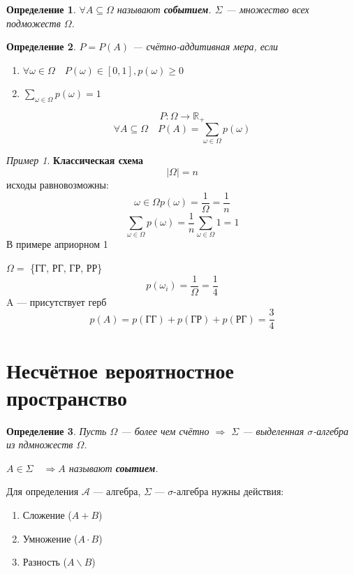 \documentclass[10pt,a4paper,oneside,titlepage]{book}
\theoremstyle{plain}
\theoremstyle{defenition}
\newtheorem{defenition}{Определение}[section]
\theoremstyle{remark}
\newtheorem*{example}{Пример}
\begin{document}
\begin{defenition}
	$\forall A\subseteq\Omega$ называют {\bfseries событием}. {\bfseries$\Sigma$} --- множество всех подможеств $\Omega$.
\end{defenition}

\begin{defenition}
	{\bfseries$P=P(A)$} --- счётно-аддитивная мера, если
	\begin{enumerate}
		\item $\forall\omega\in\Omega\quad P(\omega)\in[0, 1], p(\omega)\geqslant0$
		\item $\sum_{\omega\in\Omega}p(\omega)=1$
	\end{enumerate}
    $$
    P\colon\Omega\to\mathbb{R_+}
    $$
    $$
    \forall A\subseteq\Omega\quad P(A)=\sum_{\omega\in\Omega}p(\omega)
    $$
\end{defenition}

\begin{example}
	{\bfseries Классическая схема}
	$$
	|\Omega|=n
	$$
	исходы равновозможны: $$
	\omega\in\Omega p(\omega)=\frac{1}{\Omega}=\frac1n
	$$
	$$
	\sum_{\omega\in\Omega}p(\omega)=\frac1n\sum_{\omega\in\Omega}1=1
	$$
	В примере априорном 1
	
	$\Omega=$ \{ГГ, РГ, ГР, РР\}
	$$
	p(\omega_i)=\frac{1}{\Omega}=\frac14
	$$
	A --- присутствует герб
	$$
	p(A)=p(\mbox{ГГ})+p(\mbox{ГР})+p(\mbox{РГ})=\frac34
	$$
\end{example}

\section{Несчётное вероятностное пространство}

\begin{defenition}
Пусть $\Omega$ --- более чем счётно $\Rightarrow$ {\bfseries$\Sigma$} --- выделенная $\sigma$-алгебра из пдмножеств $\Omega$. 

$A\in\Sigma\quad\Rightarrow A$ называют {\bfseries соытием}.
\end{defenition}

Для определения $\mathcal{A}$ --- алгебра, $\Sigma$ --- $\sigma$-алгебра нужны действия:
\begin{enumerate}
	\item Сложение ($A+B$)
	\item Умножение ($A\cdot B$)
	\item Разность ($A\backslash B$)
\end{enumerate}
\end{document}
